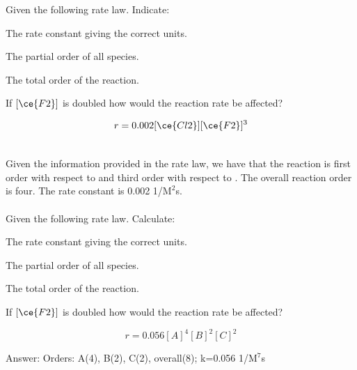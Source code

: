 \documentclass[main.tex]{subfiles}
\begin{document}
\begin{description}
\begin{example} %
Given the following rate law. Indicate:
\begin{inparaenum}[(a)]	
\item The rate constant giving the correct units.
\item	 The partial order of all species.
\item  The total order of the reaction.
\item  If $[\ce{F2}]$ is doubled how would the reaction rate be affected?
\end{inparaenum} 
\begin{center}\[r=0.002[\ce{Cl2}][\ce{F2}]^3\]\end{center}
\\
Given the information provided in the rate law, we have that the reaction is first order with respect to  and third order with respect to . The overall reaction order is four. The rate constant is 0.002 1/$\text{M}^2$s.
\\\faDiamond\ \\
Given the following rate law. Calculate:
\begin{inparaenum}[(a)]	
\item The rate constant giving the correct units.
\item	 The partial order of all species.
\item  The total order of the reaction.
\item  If $[\ce{F2}]$ is doubled how would the reaction rate be affected?
\end{inparaenum} 
\begin{center}\[r=0.056[A]^4[B]^2[C]^2\]\end{center}
\flushright Answer:   Orders: A(4), B(2), C(2), overall(8); k=0.056 1/$\text{M}^7$s
\end{example}%


\end{description}
\end{document}
